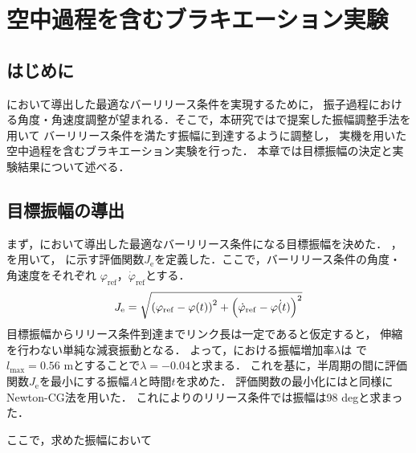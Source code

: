 \chapter[空中過程を含むブラキエーション実験]%
{空中過程を含むブラキエーション実験}
        \section{はじめに}
        
          において導出した最適なバーリリース条件を実現するために，
          振子過程における角度・角速度調整が望まれる．そこで，本研究ではで提案した振幅調整手法を用いて
          バーリリース条件を満たす振幅に到達するように調整し，
          実機を用いた空中過程を含むブラキエーション実験を行った．
          本章では目標振幅の決定と実験結果について述べる．

        \section{目標振幅の導出}

          まず，において導出した最適なバーリリース条件になる目標振幅を決めた．
          ，を用いて，
          に示す評価関数$J_{\mathrm{e}}$を定義した．ここで，バーリリース条件の角度・角速度をそれぞれ
          $\varphi_{\mathrm{ref}}$，$\dot{\varphi}_{\mathrm{ref}}$とする．
          \begin{eqnarray}
            \equlabel{error}
            J_{\mathrm{e}}=\sqrt{\left(\varphi_{\mathrm{ref}}-\varphi(t)\right)^2+\left(\dot{\varphi}_{\mathrm{ref}}-\dot{\varphi(t)}\right)^2}
          \end{eqnarray}
          目標振幅からリリース条件到達までリンク長は一定であると仮定すると，
          伸縮を行わない単純な減衰振動となる．
          よって，における振幅増加率$\lambda$は
          で$l_{\mathrm{max}}=0.56$ mとすることで$\lambda=-0.04$と求まる．
          これを基に，半周期の間に評価関数$J_{\mathrm{e}}$を最小にする振幅$A$と時間$t$を求めた．
          評価関数の最小化にはと同様にNewton-CG法を用いた．
          これによりのリリース条件では振幅は98 degと求まった．

          ここで，求めた振幅において



